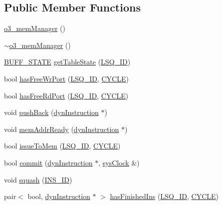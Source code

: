 \subsection*{Public Member Functions}
\begin{DoxyCompactItemize}
\item 
\hyperlink{classo3__memManager_ac2f65f772f531fa8c4a01fe6ef344bdf}{o3\_\-memManager} ()
\item 
\hyperlink{classo3__memManager_a2e67f82384e5ee8a753332a347eac62f}{$\sim$o3\_\-memManager} ()
\item 
\hyperlink{global_2global_8h_a8bd4ea2582a6025c1cfe99bf9947489c}{BUFF\_\-STATE} \hyperlink{classo3__memManager_a19302a13552a70cda08814dcfc0daa30}{getTableState} (\hyperlink{o3_2lsq_8h_a3bb5a7f1114a20672e012bf0dfe5fb24}{LSQ\_\-ID})
\item 
bool \hyperlink{classo3__memManager_af32030ab25dd729e0aa65a15e60ad562}{hasFreeWrPort} (\hyperlink{o3_2lsq_8h_a3bb5a7f1114a20672e012bf0dfe5fb24}{LSQ\_\-ID}, \hyperlink{global_2global_8h_a7e19a550ec11d1ed921deb20c22efb5b}{CYCLE})
\item 
bool \hyperlink{classo3__memManager_a71127b3f6545996a55cfa87735cb433f}{hasFreeRdPort} (\hyperlink{o3_2lsq_8h_a3bb5a7f1114a20672e012bf0dfe5fb24}{LSQ\_\-ID}, \hyperlink{global_2global_8h_a7e19a550ec11d1ed921deb20c22efb5b}{CYCLE})
\item 
void \hyperlink{classo3__memManager_a7bfed5553c2212750ee610da67bc43e7}{pushBack} (\hyperlink{classdynInstruction}{dynInstruction} $\ast$)
\item 
void \hyperlink{classo3__memManager_a401c114902989a9296444795c28cd5fb}{memAddrReady} (\hyperlink{classdynInstruction}{dynInstruction} $\ast$)
\item 
bool \hyperlink{classo3__memManager_a9e44a6173a6b099fa6e7644960aac5cf}{issueToMem} (\hyperlink{o3_2lsq_8h_a3bb5a7f1114a20672e012bf0dfe5fb24}{LSQ\_\-ID}, \hyperlink{global_2global_8h_a7e19a550ec11d1ed921deb20c22efb5b}{CYCLE})
\item 
bool \hyperlink{classo3__memManager_a3a7d3249d284d0ebb297167b47ad8ce2}{commit} (\hyperlink{classdynInstruction}{dynInstruction} $\ast$, \hyperlink{classsysClock}{sysClock} \&)
\item 
void \hyperlink{classo3__memManager_afdb4d5b4146efa960976f66c3ccd358e}{squash} (\hyperlink{global_2global_8h_a1883c47d0023d0f200e1d86eced6a070}{INS\_\-ID})
\item 
pair$<$ bool, \hyperlink{classdynInstruction}{dynInstruction} $\ast$ $>$ \hyperlink{classo3__memManager_abf1656aba29cd17f3c223f0c2ee9ba16}{hasFinishedIns} (\hyperlink{o3_2lsq_8h_a3bb5a7f1114a20672e012bf0dfe5fb24}{LSQ\_\-ID}, \hyperlink{global_2global_8h_a7e19a550ec11d1ed921deb20c22efb5b}{CYCLE})

\end{DoxyCompactItemize}
